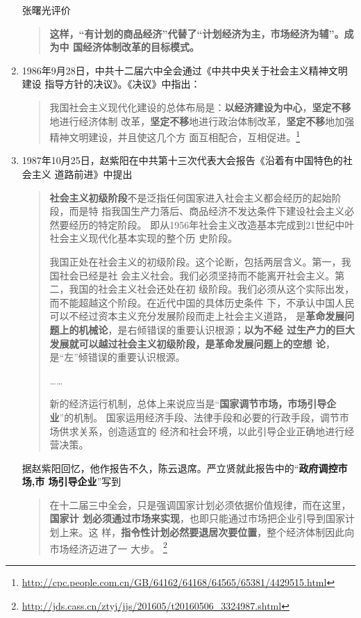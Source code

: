 \begin{enumerate}
  张曙光评价
  \begin{quotation}
    \textbf{这样，“有计划的商品经济”代替了“计划经济为主，市场经济为辅”。成为中
      国经济体制改革的目标模式。}
  \end{quotation}

\item 1986年9月28日，中共十二届六中全会通过《中共中央关于社会主义精神文明建设
  指导方针的决议》。《决议》中指出：
  \begin{quotation}
    我国社会主义现代化建设的总体布局是：\textbf{以经济建设为中心}，\textbf{坚定不移}地进行经济体制
    改革，\textbf{坚定不移}地进行政治体制改革，\textbf{坚定不移}地加强精神文明建设，并且使这几个方
    面互相配合，互相促进。\footnote{\url{http://cpc.people.com.cn/GB/64162/64168/64565/65381/4429515.html}}
  \end{quotation}

\item 1987年10月25日，赵紫阳在中共第十三次代表大会报告《沿着有中国特色的社会主义
  道路前进》中提出
  \begin{quotation}
    \textbf{社会主义初级阶段}不是泛指任何国家进入社会主义都会经历的起始阶段，而是特
    指我国生产力落后、商品经济不发达条件下建设社会主义必然要经历的特定阶段。
    即从1956年社会主义改造基本完成到21世纪中叶社会主义现代化基本实现的整个历
    史阶段。

    我国正处在社会主义的初级阶段。这个论断，包括两层含义。第一，我国社会已经是社
    会主义社会。我们必须坚持而不能离开社会主义。第二，我国的社会主义社会还处在初
    级阶段。我们必须从这个实际出发，而不能超越这个阶段。在近代中国的具体历史条件
    下，不承认中国人民可以不经过资本主义充分发展阶段而走上社会主义道路，
    是\textbf{革命发展问题上的机械论}，是右倾错误的重要认识根源；\textbf{以为不经
      过生产力的巨大发展就可以越过社会主义初级阶段，是革命发展问题上的空想
      论}，是“左”倾错误的重要认识根源。

    ……

    新的经济运行机制，总体上来说应当是“\textbf{国家调节市场，市场引导企业}”的机制。
    国家运用经济手段、法律手段和必要的行政手段，调节市场供求关系，创造适宜的
    经济和社会环境，以此引导企业正确地进行经营决策。
  \end{quotation}

  据赵紫阳回忆，他作报告不久，陈云退席。严立贤就此报告中的“\textbf{政府调控市场,市
    场引导企业}”写到
  \begin{quotation}
    在十二届三中全会，只是强调国家计划必须依据价值规律，而在这里，\textbf{国家计
      划必须通过市场来实现}，也即只能通过市场把企业引导到国家计划上来。这
    样，\textbf{指令性计划必然要退居次要位置}，整个经济体制因此向市场经济迈进了一
    大步。
    \footnote{\url{http://jds.cass.cn/ztyj/jjs/201605/t20160506_3324987.shtml}}
  \end{quotation}



\end{enumerate}
